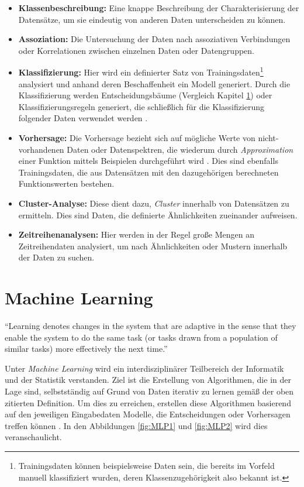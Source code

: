 \begin{itemize}
		\item \textbf{Klassenbeschreibung:} Eine knappe Beschreibung der Charakterisierung der Datensätze, um sie eindeutig von anderen Daten unterscheiden zu können. 
		\item \textbf{Assoziation:} Die Untersuchung der Daten nach assoziativen Verbindungen oder Korrelationen zwischen einzelnen Daten oder Datengruppen.   
		\item \textbf{Klassifizierung:} Hier wird ein definierter Satz von Trainingsdaten\footnote{Trainingsdaten können beispielsweise Daten sein, die bereits im Vorfeld manuell klassifiziert wurden, deren Klassenzugehörigkeit also bekannt ist.} analysiert und anhand deren Beschaffenheit ein Modell generiert. Durch die Klassifizierung werden Entscheidungsbäume (Vergleich Kapitel \ref{section:machine learning}) oder Klassifizierungsregeln generiert, die schließlich für die Klassifizierung folgender Daten verwendet werden . 
		\item \textbf{Vorhersage:} Die Vorhersage bezieht sich auf mögliche Werte von nicht-vorhandenen Daten oder Datenspektren, die wiederum durch \textit{Approximation} einer Funktion mittels Beispielen durchgeführt wird . Dies sind ebenfalls Trainingsdaten, die aus Datensätzen mit den dazugehörigen berechneten Funktionswerten bestehen. 
		\item \textbf{Cluster-Analyse:} Diese dient dazu, \textit{Cluster} innerhalb von Datensätzen zu ermitteln. Dies sind Daten, die definierte Ähnlichkeiten zueinander aufweisen. 
		\item \textbf{Zeitreihenanalysen:} Hier werden in der Regel große Mengen an Zeitreihendaten analysiert, um nach Ähnlichkeiten oder Mustern innerhalb der Daten zu suchen.  
		
\end{itemize}	

\newpage


\section{Machine Learning}
\label{section:machine learning}

\enquote{Learning denotes changes in the system that are adaptive in the sense that they enable the system to do the same task (or tasks drawn from a population of similar tasks) more effectively the next time.} 

Unter \textit{Machine Learning} wird ein interdisziplinärer Teilbereich der Informatik und der Statistik verstanden. Ziel ist die Erstellung von Algorithmen, die in der Lage sind, selbstständig auf Grund von Daten iterativ zu lernen gemäß der oben zitierten Definition. Um dies zu erreichen, erstellen diese Algorithmen basierend auf den jeweiligen Eingabedaten Modelle, die Entscheidungen oder Vorhersagen treffen können . In den Abbildungen \ref{fig:MLP1} und \ref{fig:MLP2} wird dies veranschaulicht. 


